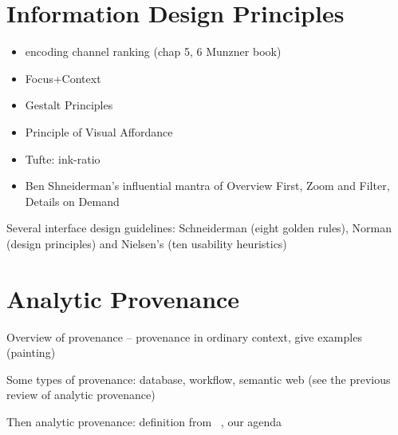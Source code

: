 \section{Information Design Principles}
\begin{itemize}
	\item encoding channel ranking (chap 5, 6 Munzner book)
	\item Focus+Context
	\item Gestalt Principles
	\item Principle of Visual Affordance
	\item Tufte: ink-ratio
	\item Ben Shneiderman’s influential mantra of Overview First, Zoom and Filter, Details on Demand
\end{itemize}







Several interface design guidelines: Schneiderman (eight golden rules), Norman (design principles) and Nielsen’s (ten usability heuristics)



%
%


\section{Analytic Provenance}
Overview of provenance -- provenance in ordinary context, give examples (painting)

Some types of provenance: database, workflow, semantic web (see the previous review of analytic provenance)

Then analytic provenance: definition from ~\cite{North2011}, our agenda~\cite{Xu2015}


